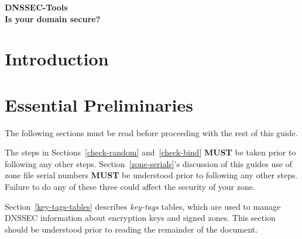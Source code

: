 \documentclass[12pt]{article}
\begin{document}
\begin{center}
{\Large
{\bf DNSSEC-Tools\\
Is your domain secure?}}
\end{center}
\tableofcontents
\clearpage
\listoffigures


\clearpage

\section{Introduction}
\label{intro}




\clearpage

\section{Essential Preliminaries}
\label{preliminaries}

The following sections must be read before proceeding with the rest of this
guide.

The steps in Sections~\ref{check-random} and~\ref{check-bind} {\bf MUST} be
taken prior to following any other steps.  Section~\ref{zone-serials}'s
discussion of this guides use of zone file serial numbers {\bf MUST} be
understood prior to following any other steps.  Failure to do any of these
three could affect the security of your zone.

Section~\ref{key-tags-tables} describes {\it key-tags} tables, which are used
to manage DNSSEC information about encryption keys and signed zones.  This
section should be understood prior to reading the remainder of the document.

\end{document}
